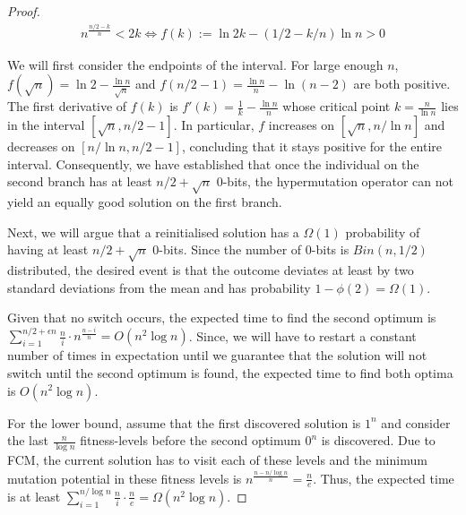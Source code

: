 \documentclass[lettersize,journal]{IEEEtran}
\begin{document}
\begin{proof}
{	\begin{align*}
		 n^{\frac{n/2 -k}{n}} < 2k \iff f(k):= \ln{2k} - (1/2 - k/n)\ln{n}  > 0
	\end{align*}
	
	We will first consider the endpoints of the interval.
	For large enough $n$, $f(\sqrt{n})=\ln{2}-\frac{\ln{n}}{\sqrt{n}}$ and  $f(n/2 -1 )=\frac{\ln{n}}{n} - \ln{(n-2)}$ are both positive. The first derivative of $f(k)$ is $f'(k)=\frac{1}{k} - \frac{\ln{n}}{n}$ whose critical point $k=\frac{n}{\ln{n}}$ lies in the interval $[\sqrt{n},n/2-1]$. In particular, $f$ increases on $[\sqrt{n}, n/ \ln{n}]$ and decreases on $[n/\ln{n},n/2 -1 ]$, concluding that it stays positive for the entire interval. Consequently, we have established that once the individual on the second branch has at least $n/2 + \sqrt{n}$ $0$-bits, the hypermutation operator can not yield an equally good solution on the first branch. 
	
	Next, we will argue that a reinitialised solution has a $\Omega(1)$ probability of having at least $n/2 + \sqrt{n}$ $0$-bits. Since the number of $0$-bits is $Bin(n, 1/2)$ distributed, the desired event is that the outcome deviates at least by two standard deviations from the mean and has probability $1-\phi(2) = \Omega(1)$. 
	
}

	 Given that no switch occurs, the expected time to find the second optimum is $\sum_{i=1}^{n/2+\epsilon n} \frac{n}{i} \cdot 
	n^{\frac{n-i}{n}}=O(n^{2}\log{n})$. Since, we will have to restart a constant number of times in expectation until we guarantee that the solution will not switch until the second optimum is found, the expected time to find both optima is $O(n^{2}\log{n})$.
	
	For the lower bound, assume that the first discovered solution is $1^n$ and consider the last $\frac{n}{\log{n}}$ fitness-levels before the second optimum $0^n$ is discovered. Due to FCM, the current solution has to visit each of these levels and the minimum mutation potential in these fitness levels is $n^{\frac{n-n/\log{n}}{n}}=\frac{n}{e}$. Thus, the expected time is at least $\sum_{i=1}^{n/\log{n}} \frac{n}{i}\cdot \frac{n}{e} = \Omega(n^2 \log{n})$. 
	
	
	
\end{proof}


\end{document}
